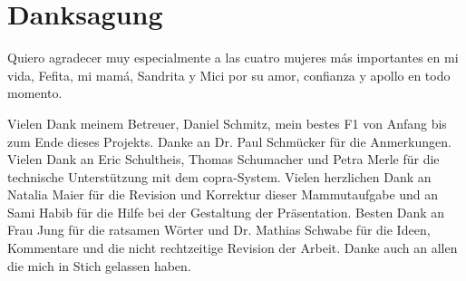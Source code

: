 \chapter*{Danksagung}

Quiero agradecer muy especialmente a las cuatro mujeres m\'as importantes en mi vida, Fefita, mi mam\'a, Sandrita y Mici por su amor, confianza y apollo en todo momento.

Vielen Dank meinem Betreuer, Daniel Schmitz, mein bestes F1 von Anfang bis zum Ende dieses Projekts. Danke an Dr. Paul Schmücker für die Anmerkungen. Vielen Dank an Eric Schultheis, Thomas Schumacher und Petra Merle für die technische Unterstützung mit dem \acs{copra}-System. Vielen herzlichen Dank an Natalia Maier für die Revision und Korrektur dieser Mammutaufgabe und an Sami Habib für die Hilfe bei der Gestaltung der Präsentation. Besten Dank an Frau Jung für die ratsamen Wörter und Dr. Mathias Schwabe für die Ideen, Kommentare und die nicht rechtzeitige Revision der Arbeit. Danke auch an allen die mich in Stich gelassen haben.
